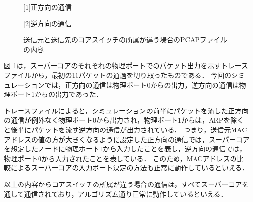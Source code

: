 \begin{figure}[tb]
	\begin{center}
		
		\begin{center}
			\hspace{1.6cm} [1]正方向の通信
		\end{center}
		
		\begin{center}
			\hspace{1.6cm} [2]逆方向の通信
		\end{center}
		\caption{送信元と送信先のコアスイッチの所属が違う場合のPCAPファイルの内容}
		\label{fig:4-3}
	\end{center}
\end{figure}

図 \ref{fig:4-3}は，スーパーコアのそれぞれの物理ポートでのパケット出力を示すトレースファイルから，最初の10パケットの通過を切り取ったものである．
今回のシミュレーションでは，正方向の通信は物理ポート0からの出力，逆方向の通信は物理ポート1からの出力であった．

トレースファイルによると，シミュレーションの前半にパケットを流した正方向の通信が例外なく物理ポート0から出力され，物理ポート1からは，ARPを除くと後半にパケットを流す逆方向の通信が出力されている．
つまり，送信元MACアドレスの値の方が大きくなるように設定した正方向の通信では，スーパーコアを想定したノードに物理ポート1から入力したことを表し，逆方向の通信では，物理ポート0から入力されたことを表している．
このため，MACアドレスの比較によるスーパーコアの入力ポート決定の方法も正常に動作しているといえる．

以上の内容からコアスイッチの所属が違う場合の通信は，すべてスーパーコアを通して通信されており，アルゴリズム通り正常に動作しているといえる．

